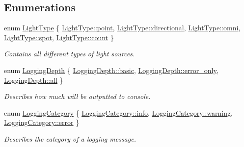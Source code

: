 \subsection*{Enumerations}
\begin{DoxyCompactItemize}
\item 
enum \mbox{\hyperlink{namespaceec_a30e2a743ebdeb02ac68a6cfa50f629c7}{Light\+Type}} \{ \newline
\mbox{\hyperlink{namespaceec_a30e2a743ebdeb02ac68a6cfa50f629c7a78ee54aa8f813885fe2fe20d232518b9}{Light\+Type\+::point}}, 
\mbox{\hyperlink{namespaceec_a30e2a743ebdeb02ac68a6cfa50f629c7aff17f76a314be3abfb17f7c9e849ba34}{Light\+Type\+::directional}}, 
\mbox{\hyperlink{namespaceec_a30e2a743ebdeb02ac68a6cfa50f629c7a3aa53cec161c587e51555bdfa5c56eff}{Light\+Type\+::omni}}, 
\mbox{\hyperlink{namespaceec_a30e2a743ebdeb02ac68a6cfa50f629c7ab2e189abf85e809a51522cdb0e53083a}{Light\+Type\+::spot}}, 
\newline
\mbox{\hyperlink{namespaceec_a30e2a743ebdeb02ac68a6cfa50f629c7ae2942a04780e223b215eb8b663cf5353}{Light\+Type\+::count}}
 \}
\begin{DoxyCompactList}\small\item\em Contains all different types of light sources. \end{DoxyCompactList}\item 
enum \mbox{\hyperlink{namespaceec_a4b0151aefd16631c24dd6464fd331e4b}{Logging\+Depth}} \{ \mbox{\hyperlink{namespaceec_a4b0151aefd16631c24dd6464fd331e4baf17aaabc20bfe045075927934fed52d2}{Logging\+Depth\+::basic}}, 
\mbox{\hyperlink{namespaceec_a4b0151aefd16631c24dd6464fd331e4bab5e7a5d958347ed25ea6dc293d107e15}{Logging\+Depth\+::error\+\_\+only}}, 
\mbox{\hyperlink{namespaceec_a4b0151aefd16631c24dd6464fd331e4baa181a603769c1f98ad927e7367c7aa51}{Logging\+Depth\+::all}}
 \}
\begin{DoxyCompactList}\small\item\em Describes how much will be outputted to console. \end{DoxyCompactList}\item 
enum \mbox{\hyperlink{namespaceec_a67e511e8b22e1051ea392cb2f68315d8}{Logging\+Category}} \{ \mbox{\hyperlink{namespaceec_a67e511e8b22e1051ea392cb2f68315d8acaf9b6b99962bf5c2264824231d7a40c}{Logging\+Category\+::info}}, 
\mbox{\hyperlink{namespaceec_a67e511e8b22e1051ea392cb2f68315d8a7b83d3f08fa392b79e3f553b585971cd}{Logging\+Category\+::warning}}, 
\mbox{\hyperlink{namespaceec_a67e511e8b22e1051ea392cb2f68315d8acb5e100e5a9a3e7f6d1fd97512215282}{Logging\+Category\+::error}}
 \}
\begin{DoxyCompactList}\small\item\em Describes the category of a logging message. \end{DoxyCompactList}\end{DoxyCompactItemize}
